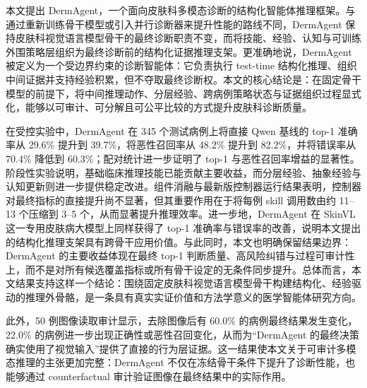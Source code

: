 \documentclass{article}
\begin{document}
本文提出 DermAgent，一个面向皮肤科多模态诊断的结构化智能体推理框架。与通过重新训练骨干模型或引入并行诊断器来提升性能的路线不同，DermAgent 保持皮肤科视觉语言模型骨干的最终诊断职责不变，而将技能、经验、认知与可训练外围策略层组织为最终诊断前的结构化证据推理支架。更准确地说，DermAgent 被定义为一个受边界约束的诊断智能体：它负责执行 test-time 结构化推理、组织中间证据并支持经验积累，但不夺取最终诊断权。本文的核心结论是：在固定骨干模型的前提下，将中间推理动作、分层经验、跨病例策略状态与证据组织过程显式化，能够以可审计、可分解且可公平比较的方式提升皮肤科诊断质量。

在受控实验中，DermAgent 在 345 个测试病例上将直接 Qwen 基线的 top-1 准确率从 29.6\% 提升到 39.7\%，将恶性召回率从 48.2\% 提升到 82.2\%，并将错误率从 70.4\% 降低到 60.3\%；配对统计进一步证明了 top-1 与恶性召回率增益的显著性。阶段性实验说明，基础临床推理技能已能贡献主要收益，而分层经验、抽象经验与认知更新则进一步提供稳定改进。组件消融与最新版控制器运行结果表明，控制器对最终指标的直接提升尚不显著，但其重要作用在于将每例 skill 调用数由约 11--13 个压缩到 3--5 个，从而显著提升推理效率。进一步地，DermAgent 在 SkinVL 这一专用皮肤病大模型上同样获得了 top-1 准确率与错误率的改善，说明本文提出的结构化推理支架具有跨骨干应用价值。与此同时，本文也明确保留结果边界：DermAgent 的主要收益体现在最终 top-1 判断质量、高风险纠错与过程可审计性上，而不是对所有候选覆盖指标或所有骨干设定的无条件同步提升。总体而言，本文结果支持这样一个结论：围绕固定皮肤科视觉语言模型骨干构建结构化、经验驱动的推理外骨骼，是一条具有真实实证价值和方法学意义的医学智能体研究方向。

此外，50 例图像读取审计显示，去除图像后有 60.0\% 的病例最终结果发生变化，22.0\% 的病例进一步出现正确性或恶性召回变化，从而为“DermAgent 的最终决策确实使用了视觉输入”提供了直接的行为层证据。这一结果使本文关于可审计多模态推理的主张更加完整：DermAgent 不仅在冻结骨干条件下提升了诊断性能，也能够通过 counterfactual 审计验证图像在最终结果中的实际作用。



\end{document}
